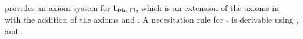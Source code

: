 
 provides an axiom system for $\mathsf{L}_{{\sf Kh}_i,\square}$, which is an extension of the axioms in~ with the addition of the axioms  and .
A necesitation rule for $\square$ is derivable using ,  and .









